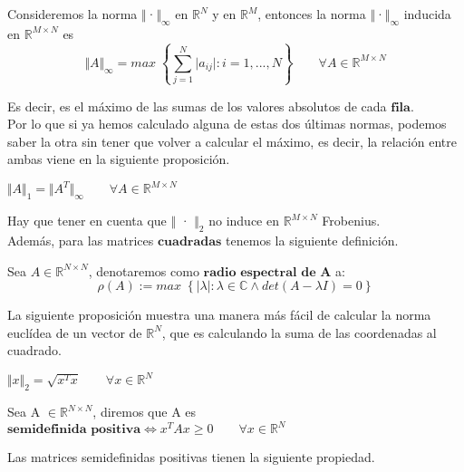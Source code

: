 \begin{nprop}
Consideremos la norma $\Vert$·$\Vert _\infty$ en $\mathbb{R}^N$ y en $\mathbb{R}^M$, entonces la norma $\Vert$·$\Vert _\infty$ inducida en $\mathbb{R}^{M \times N}$ es
\[ \Vert A \Vert _\infty = max \; \left\lbrace \sum_{j=1}^N \vert a_{ij} \vert : i = 1,...,N \right\rbrace \qquad \forall A \in \mathbb{R}^{M \times N} \]
\end{nprop}

Es decir, es el máximo de las sumas de los valores absolutos de cada $\textbf{fila}$.\\

Por lo que si ya hemos calculado alguna de estas dos últimas normas, podemos saber la otra sin tener que volver a calcular el máximo, es decir, la relación entre ambas viene en la siguiente proposición.

\begin{nprop}
$\Vert A \Vert _1 = \Vert A^T \Vert _\infty \qquad \forall A \in \mathbb{R}^{M \times N}$
\end{nprop}

Hay que tener en cuenta que $\Vert$ · $\Vert _2$ no induce en $\mathbb{R}^{M \times N}$ Frobenius.\\

Además, para las matrices $\textbf{cuadradas}$ tenemos la siguiente definición.

\begin{ndef}
Sea $A \in \mathbb{R}^{N \times N}$, denotaremos como $\textbf{radio espectral de A}$ a:
\[ \rho (A) := max \; \left\lbrace \vert \lambda \vert : \lambda \in \mathbb{C} \wedge det(A - \lambda I) = 0 \right\rbrace \]
\end{ndef}

La siguiente proposición muestra una manera más fácil de calcular la norma euclídea de un vector de $\mathbb{R}^N$, que es calculando la suma de las coordenadas al cuadrado.

\begin{nprop}
$\Vert x \Vert _2 = \sqrt{x^Tx} \qquad \forall x \in \mathbb{R}^N$
\end{nprop}

\begin{ndef}
Sea A $\in \mathbb{R}^{N \times N}$, diremos que A es $\textbf{semidefinida positiva} \Leftrightarrow x^TAx \geq 0 \qquad \forall x \in \mathbb{R}^N $
\end{ndef}

Las matrices semidefinidas positivas tienen la siguiente propiedad.

